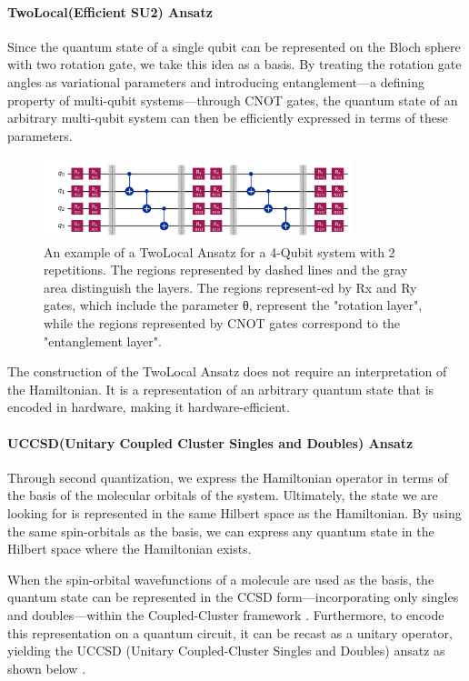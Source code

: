 \documentclass[pdflatex,sn-mathphys-num]{sn-jnl}%
\theoremstyle{thmstyleone}%
\theoremstyle{thmstyletwo}%
\theoremstyle{thmstylethree}%
\begin{document}
\paragraph{TwoLocal(Efficient SU2) Ansatz} \leavevmode \newline
Since the quantum state of a single qubit can be represented on the Bloch sphere with two rotation gate, we take this idea as a basis. 
By treating the rotation gate angles as variational parameters and introducing entanglement—a defining property of multi-qubit systems—through CNOT gates, 
the quantum state of an arbitrary multi-qubit system can then be efficiently expressed in terms of these parameters\cite{TL1,TL2}.

\begin{figure}[htbp]
\centering
\includegraphics[width=0.8\textwidth]{fig/twolocal.png}
\caption{An example of a TwoLocal Ansatz for a 4-Qubit system with 2 repetitions. The regions represented by dashed lines and the gray area distinguish the layers. The regions represent-ed by Rx and Ry gates, which include the parameter θ, represent the "rotation layer", while the regions represented by CNOT gates correspond to the "entanglement layer".}\label{Fig.3}
\end{figure}
The construction of the TwoLocal Ansatz does not require an interpretation of the Hamiltonian. It is a representation of an arbitrary quantum state that is encoded in hardware, making it hardware-efficient.

\paragraph{UCCSD(Unitary Coupled Cluster Singles and Doubles) Ansatz} \leavevmode \newline
Through second quantization, we express the Hamiltonian operator in terms of the basis of the molecular orbitals of the system. 
Ultimately, the state we are looking for is represented in the same Hilbert space as the Hamiltonian. By using the same spin-orbitals as the basis, 
we can express any quantum state in the Hilbert space where the Hamiltonian exists. 

When the spin-orbital wavefunctions of a molecule are used as the basis, the quantum state can be represented in the CCSD form—incorporating only singles and doubles—within the Coupled-Cluster framework \cite{CC1,CC2}. Furthermore, to encode this representation on a quantum circuit, it can be recast as a unitary operator, yielding the UCCSD (Unitary Coupled-Cluster Singles and Doubles) ansatz as shown below \cite{UCC1,UCC2}.
\end{document}
